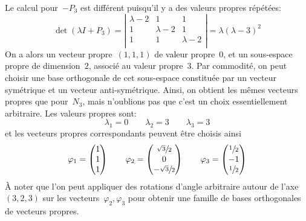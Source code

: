 Le calcul pour~$-P_3$ est différent puisqu'il y a des valeurs propres répétées:
\[
	\det\left(\lambda I + P_3\right)
	=
	\left|
	\begin{matrix}
		\lambda-2 & 1 & 1 \\
		1 & \lambda-2 & 1 \\
		1 & 1 & \lambda-2 \\
	\end{matrix}
	\right|
	=\lambda(\lambda-3)^2
\]
On a alors un vecteur propre~$(1,1,1)$ de valeur propre~$0$, et un sous-espace
propre de dimension~$2$, associé au valeur propre~$3$.  Par commodité, on peut
choisir une base orthogonale de cet sous-espace constituée par un vecteur
symétrique et un vecteur anti-symétrique.  Ainsi, on obtient les mêmes vecteurs
propres que pour~$N_3$, mais n'oublions pas que c'est un choix essentiellement
arbitraire.  Les valeurs propres sont:
\[
	\lambda_1 = 0
	\qquad
	\lambda_2 = 3
	\qquad
	\lambda_3 = 3
\]
et les vecteurs propres correspondants peuvent être choisis ainsi
\[
	\varphi_1=\begin{pmatrix}
		1\\
		1\\
		1
	\end{pmatrix}
	\qquad
	\varphi_2=\begin{pmatrix}
		\sfrac{\sqrt3}2\\
		0\\
		-\sfrac{\sqrt3}2
	\end{pmatrix}
	\qquad
	\varphi_3=\begin{pmatrix}
		\sfrac12\\
		-1\\
		\sfrac12\\
	\end{pmatrix}
\]
À noter que l'on peut appliquer des rotations d'angle arbitraire autour de
l'axe~$(3,2,3)$ sur les vecteurs~$\varphi_2,\varphi_3$ pour obtenir une famille
de bases orthogonales de vecteurs propres.


